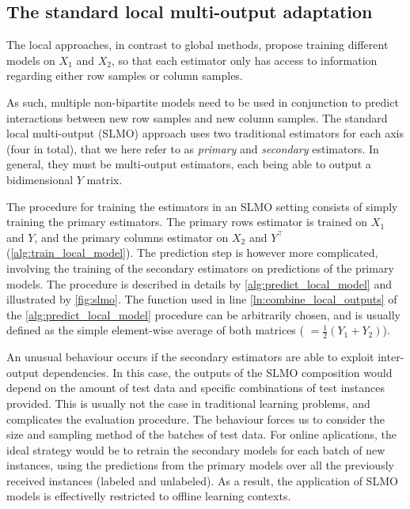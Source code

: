 
\subsection{The standard local multi-output adaptation}
\label{sec:slmo}

The local approaches, in contrast to global methods, propose training different models on $X_1$ and $X_2$, so that each estimator only has access to information regarding either row samples or column samples.

As such, multiple non-bipartite models need to be used in conjunction to predict interactions between new row samples and new column samples. The standard local multi-output (SLMO) approach uses two traditional estimators for each axis (four in total), that we here refer to as \emph{primary} and \emph{secondary} estimators.
In general, they must be multi-output estimators, each being able to output a bidimensional $Y$ matrix.

The procedure for training the estimators in an SLMO setting consists of simply training the primary estimators. The primary rows estimator is trained on $X_1$ and $Y$, and the primary columns estimator on $X_2$ and $Y^\intercal$ (\autoref{alg:train_local_model}). The prediction step is however more complicated, involving the training of the secondary estimators on predictions of the primary models.
The procedure is described in details by \autoref{alg:predict_local_model} and illustrated by \autoref{fig:slmo}. The \KwCombine function used in line \autoref{ln:combine_local_outputs} of the \autoref{alg:predict_local_model} procedure can be arbitrarily chosen, and is usually defined as the simple element-wise average of both matrices ( $= \frac{1}{2}(Y_1 + Y_2)$).


\algTrainLocalModel
\algPredictLocalModel

An unusual behaviour occurs if the secondary estimators are able to exploit inter-output dependencies. In this case, the outputs of the SLMO composition would depend on the amount of test data and specific combinations of test instances provided. This is usually not the case in traditional learning problems, and complicates the evaluation procedure. The behaviour forces us to consider the size and sampling method of the batches of test data. For online aplications, the ideal strategy would be to retrain the secondary models for each batch of new instances, using the predictions from the primary models over all the previously received instances (labeled and unlabeled). As a result, the application of SLMO models is effectivelly restricted to offline learning contexts.

